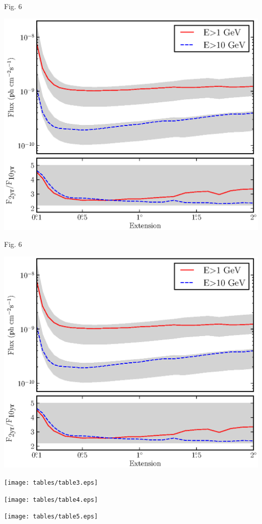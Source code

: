 \documentclass[12pt]{beamer}
\begin{document}
\begin{frame}{Fig. 6}
  \begin{center}
    \includegraphics[scale=0.5]{../paper/mc_plots/time_sensitivity_color.eps}
  \end{center}
\end{frame}

\begin{frame}{Fig. 6}
  \begin{center}
    \includegraphics[scale=0.5]{../paper/mc_plots/time_sensitivity_color.eps}
  \end{center}
\end{frame}


\begin{frame}
  \begin{center}
    \texttt{[image: tables/table3.eps]}
  \end{center}
\end{frame}

\begin{frame}
  \begin{center}
    \texttt{[image: tables/table4.eps]}
  \end{center}
\end{frame}

\begin{frame}
  \begin{center}
    \texttt{[image: tables/table5.eps]}
  \end{center}
\end{frame}
\end{document}
